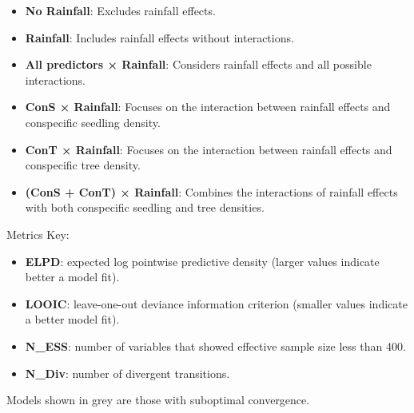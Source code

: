 \documentclass[
  12pt,
  letterpaper,
  DIV=11,
  numbers=noendperiod]{scrartcl}
\providecommand{\tightlist}{%
  \setlength{\itemsep}{0pt}\setlength{\parskip}{0pt}}\usepackage{longtable,booktabs,array}
\begin{document}
\begin{itemize}
\tightlist
\item
  \textbf{No Rainfall}: Excludes rainfall effects.
\item
  \textbf{Rainfall}: Includes rainfall effects without interactions.
\item
  \textbf{All predictors × Rainfall}: Considers rainfall effects and all
  possible interactions.
\item
  \textbf{ConS × Rainfall}: Focuses on the interaction between rainfall
  effects and conspecific seedling density.
\item
  \textbf{ConT × Rainfall}: Focuses on the interaction between rainfall
  effects and conspecific tree density.
\item
  \textbf{(ConS + ConT) × Rainfall}: Combines the interactions of
  rainfall effects with both conspecific seedling and tree densities.
\end{itemize}

Metrics Key:

\begin{itemize}
\tightlist
\item
  \textbf{ELPD}: expected log pointwise predictive density (larger
  values indicate better a model fit).
\item
  \textbf{LOOIC}: leave-one-out deviance information criterion (smaller
  values indicate a better model fit).
\item
  \textbf{N\_ESS}: number of variables that showed effective sample size
  less than 400.
\item
  \textbf{N\_Div}: number of divergent transitions.
\end{itemize}

Models shown in grey are those with suboptimal convergence.
\end{document}
